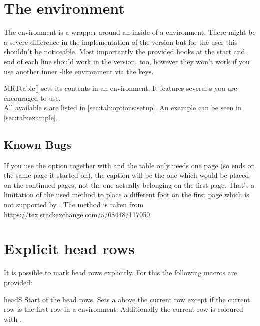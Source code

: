 \section{The  environment}\label{sec:tab:table}%
The  environment is a wrapper around an  inside of
a  environment. There might be a severe difference in the
implementation of the  version but for the user this shouldn't be
noticeable. Most importantly the provided hooks at the start and end of each
line should work in the  version, too, however they won't work if you
use another inner -like environment via the  keys.

\begin{describeenv}{MRTtable}[]
   sets its contents in an  environment. It
  features several s you are encouraged to use.
  \\[\parskip]
  All available s are listed in \autoref{sec:tab:options:setup}. An
  example can be seen in \autoref{sec:tab:example}.
\end{describeenv}

\subsection{Known Bugs}
If you use the  option together with  and the table
only needs one page (so ends on the same page it started on), the caption will
be the one which would be placed on the continued pages, not the one actually
belonging on the first page. That's a limitation of the used method to place a
different foot on the first page which is not supported by . The
method is taken from \url{https://tex.stackexchange.com/a/68448/117050}.

\section{Explicit head rows}\label{sec:tab:explicit}%
It is possible to mark head rows explicitly. For this the following macros are
provided:

\begin{describemacro}{headS}%
  Start of the head rows. Sets a  above the current row except if the
  current row is the first row in a  environment. Additionally
  the current row is coloured with .
\end{describemacro}%

